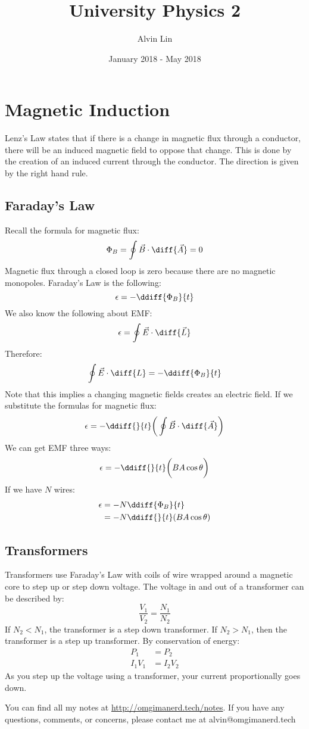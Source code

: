 \documentclass{math}
\title{University Physics 2}
\author{Alvin Lin}
\date{January 2018 - May 2018}
\begin{document}
\maketitle

\section*{Magnetic Induction}
Lenz's Law states that if there is a change in magnetic flux through a
conductor, there will be an induced magnetic field to oppose that change. This
is done by the creation of an induced current through the conductor. The
direction is given by the right hand rule.

\subsection*{Faraday's Law}
Recall the formula for magnetic flux:
\[ \Phi_B = \oint\vec{B}\cdot\diff{\vec{A}} = 0 \]
Magnetic flux through a closed loop is zero because there are no magnetic
monopoles. Faraday's Law is the following:
\[ \epsilon = -\ddiff{\Phi_B}{t} \]
We also know the following about EMF:
\[ \epsilon = \oint\vec{E}\cdot\diff{\vec{L}} \]
Therefore:
\[ \oint\vec{E}\cdot\diff{L} = -\ddiff{\Phi_B}{t} \]
Note that this implies a changing magnetic fields creates an electric field.
If we substitute the formulas for magnetic flux:
\[ \epsilon = -\ddiff{}{t}\bigg(\oint\vec{B}\cdot\diff{\vec{A}}\bigg) \]
We can get EMF three ways:
\[ \epsilon = -\ddiff{}{t}\bigg(BA\cos\theta\bigg) \]
If we have \( N \) wires:
\begin{align*}
  \epsilon &= -N\ddiff{\Phi_B}{t} \\
  &= -N\ddiff{}{t}(BA\cos\theta)
\end{align*}

\subsection*{Transformers}
Transformers use Faraday's Law with coils of wire wrapped around a magnetic
core to step up or step down voltage. The voltage in and out of a transformer
can be described by:
\[ \frac{V_1}{V_2} = \frac{N_1}{N_2} \]
If \( N_2 < N_1 \), the transformer is a step down transformer. If
\( N_2 > N_1 \), then the transformer is a step up transformer. By conservation
of energy:
\begin{align*}
  P_1 &= P_2 \\
  I_1V_1 &= I_2V_2
\end{align*}
As you step up the voltage using a transformer, your current proportionally
goes down.

\begin{center}
  You can find all my notes at \url{http://omgimanerd.tech/notes}. If you have
  any questions, comments, or concerns, please contact me at
  alvin@omgimanerd.tech
\end{center}
\end{document}
